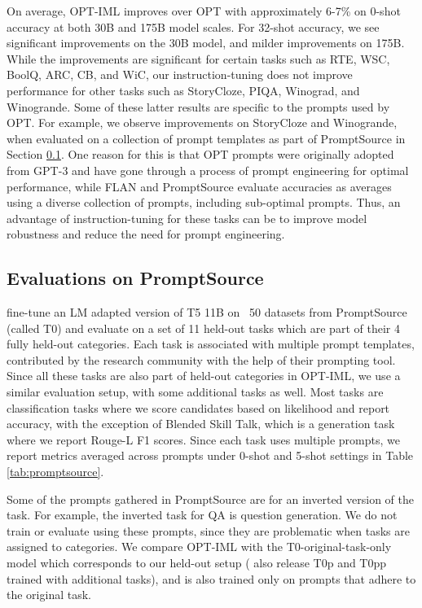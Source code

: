 On average, OPT-IML improves over OPT with approximately 6-7\% on 0-shot accuracy at both 30B and 175B model scales. For 32-shot accuracy, we see significant improvements on the 30B model, and milder improvements on 175B. While the improvements are significant for certain tasks such as RTE, WSC, BoolQ, ARC, CB, and WiC, our instruction-tuning does not improve performance for other tasks such as StoryCloze, PIQA, Winograd,  and Winogrande. Some of these latter results are specific to the prompts used by OPT. For example, we observe improvements on StoryCloze and Winogrande, when evaluated on a collection of prompt templates as part of PromptSource in Section \ref{subsec:eval-promptsource}. One reason for this is that OPT prompts were originally adopted from GPT-3 \citep{brown2020gpt} and have gone through a process of prompt engineering for optimal performance, while FLAN and PromptSource evaluate accuracies as averages using a diverse collection of prompts, including sub-optimal prompts. Thus, an advantage of instruction-tuning for these tasks can be to improve model robustness and reduce the need for prompt engineering.

\subsection{Evaluations on PromptSource}
\label{subsec:eval-promptsource}
\cite{sanh2021t0} fine-tune an LM adapted version of T5 11B\citep{raffel2020t5,lester2021power} on ~50 datasets from PromptSource (called T0) and evaluate on a set of 11 held-out tasks which are part of their 4 fully held-out categories. Each task is associated with multiple prompt templates, contributed by the research community with the help of their prompting tool. Since all these tasks are also part of held-out categories in OPT-IML, we use a similar evaluation setup, with some additional tasks as well. Most tasks are classification tasks where we score candidates based on likelihood and report accuracy, with the exception of Blended Skill Talk, which is a generation task where we report Rouge-L F1 scores. Since each task uses multiple prompts, we report metrics averaged across prompts under 0-shot and 5-shot settings in Table \ref{tab:promptsource}. 

Some of the prompts gathered in PromptSource are for an inverted version of the task. For example, the inverted task for QA is question generation. We do not train or evaluate using these prompts, since they are problematic when tasks are assigned to categories. We compare OPT-IML with the T0-original-task-only model which corresponds to our held-out setup (\cite{sanh2021t0} also release T0p and T0pp trained with additional tasks), and is also trained only on prompts that adhere to the original task. 

